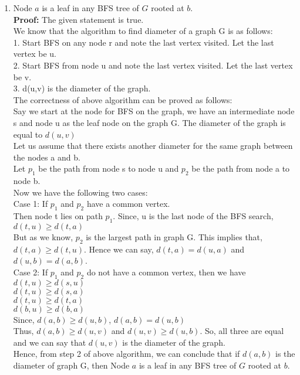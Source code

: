 \documentclass[12pt]{article}
\begin{document}
\begin{enumerate}
\begin{enumerate}
\item Node $a$ is a leaf in any BFS tree of $G$ rooted at $b$.\\
\textbf{Proof:} The given statement is true. \\
We know that the algorithm to find diameter of a graph G is as follows:\\
1. Start BFS on any node r and note the last vertex visited. Let the last vertex be u.\\
2. Start BFS from node u and note the last vertex visited. Let the last vertex be v.\\
3. d(u,v) is the diameter of the graph.\\
The correctness of above algorithm can be proved as follows:\\
Say we start at the node for BFS on the graph, we have an intermediate node s and node 
u as the leaf node on the graph G. The diameter of the graph is equal to $d(u,v)$\\
Let us assume that there exists another diameter for the same graph between the nodes a and b.\\
Let $p_1$ be the path from node s to node u and $p_2$ be the path from node a to node b.\\
Now we have the following two cases: \\
Case 1: If $p_1$ and $p_2$ have a common vertex.\\
Then node t lies on path $p_1$. Since, u is the last node of the BFS search, $d(t,u) \ge d(t,a)$\\
But as we know, $p_2$ is the largest path in graph G. This implies that, $d(t,a) \ge d(t,u)$. Hence we can say, $d(t,a) = d(u,a)$
and $d(u,b) = d(a,b)$.\\
Case 2: If $p_1$ and $p_2$ do not have a common vertex, then we have\\
$d(t,u) \ge d(s,u)$\\
$d(t,u) \ge d(s,a)$\\
$d(t,u) \ge d(t,a)$\\
$d(b,u) \ge d(b,a)$\\
Since, $d(a,b) \ge d(u,b)$, $d(a,b) = d(u,b)$\\
Thus, $d(a,b) \ge d(u,v)$ and $d(u,v) \ge d(u,b)$. So, all three are equal and we can say that $d(u,v)$ is the diameter of the graph.\\
Hence, from step 2 of above algorithm, we can conclude that if $d(a,b)$ is the diameter of graph G, then Node $a$ is a leaf in any BFS tree of $G$ rooted at $b$.\\


\end{enumerate}
\end{enumerate}
\end{document}
